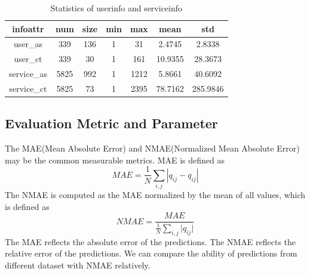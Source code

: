 \documentclass[conference]{IEEEtran}
\begin{document}
\begin{table}[H]
\begin{threeparttable}
\caption{Statistics of userinfo and serviceinfo}
\label{tb2}
\begin{tabular}{c||c|c||c|c|c|c}
\hline 
infoattr & num & size & min & max & mean & std \\
\hline
user\_as & 339   & 136   & 1     & 31    & 2.4745 & 2.8338 \\
\hline
user\_ct & 339   & 30    & 1     & 161   & 10.9355 & 28.3673 \\
\hline
service\_as & 5825  & 992   & 1     & 1212  & 5.8661 & 40.6092 \\
\hline
service\_ct & 5825  & 73    & 1     & 2395  & 78.7162 & 285.9846 \\
\hline
\end{tabular} 
\end{threeparttable}
\end{table}

\subsection{Evaluation Metric and Parameter}
The MAE(Mean Absolute Error) and NMAE(Normalized Mean Absolute Error) may be the common measurable metrics. MAE is defined as 
\begin{equation}
MAE=\frac{1}{N}\sum_{i,j}{|q_{ij}-q^{\hat{}}_{ij}|}
\end{equation}
The NMAE is computed as the MAE normalized by the mean of all values, which is defined as 
\begin{equation}
NMAE=\frac{MAE}{\frac{1}{N}\sum_{i,j}{|q_{ij}}|}
\end{equation}
The MAE reflects the absolute error of the predictions. The NMAE reflects the relative error of the predictions. We can compare the ability of predictions from different dataset with NMAE relatively.
\end{document}
